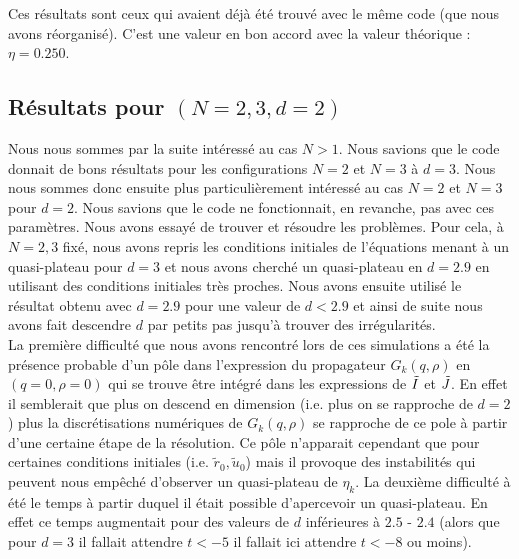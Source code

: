 \documentclass[10.5pt]{article}
\begin{document}
\begin{multicols*}{2}
Ces résultats sont ceux qui avaient déjà été trouvé avec le même code (que nous avons réorganisé). C'est une valeur en bon accord avec la valeur théorique : $\eta = 0.250$.  \\




\subsection{Résultats pour $(N = 2,3, d=2)$}


Nous nous sommes par la suite intéressé au cas $N>1$. Nous savions que le code donnait de bons résultats pour les configurations $N = 2$ et $N=3$ à $d=3$. Nous nous sommes donc ensuite plus particulièrement intéressé au cas $N = 2$ et $N=3$ pour $d = 2$. Nous savions que le code ne fonctionnait, en revanche, pas avec ces paramètres. Nous avons essayé de trouver et résoudre les problèmes. Pour cela, à $N=2,3$ fixé, nous avons repris les conditions initiales de l'équations menant à un quasi-plateau pour $d=3$ et nous avons cherché un quasi-plateau en $d= 2.9$ en utilisant des conditions initiales très proches. Nous avons ensuite utilisé le résultat obtenu avec $d = 2.9$ pour une valeur de $d < 2.9$ et ainsi de suite nous avons fait descendre $d$ par petits pas jusqu'à trouver des irrégularités. \\

 La première difficulté que nous avons rencontré lors de ces simulations a été la présence probable d'un pôle dans l'expression du propagateur $G_k(q, \rho)$ en $(q = 0, \rho = 0)$ qui se trouve être intégré dans les expressions de $\tilde{I}$ et $\tilde{J}$. En effet il semblerait que plus on descend en dimension (i.e. plus on se rapproche de $d=2$) plus la discrétisations numériques de $G_k(q, \rho)$ se rapproche de ce pole à partir d'une certaine étape de la résolution. Ce pôle n'apparait cependant que pour certaines conditions initiales (i.e. $\tilde{r}_0, \tilde{u}_0$) mais il provoque des instabilités qui peuvent nous empêché d'observer un quasi-plateau de $\eta_k$. La deuxième difficulté à été le temps à partir duquel il était possible d'apercevoir un quasi-plateau. En effet ce temps augmentait pour des valeurs de $d$ inférieures à $2.5$ - $2.4$ (alors que pour $d=3$ il fallait attendre $t<-5$ il fallait ici attendre $t<-8$ ou moins). \\
 

\end{multicols*}
\end{document}
